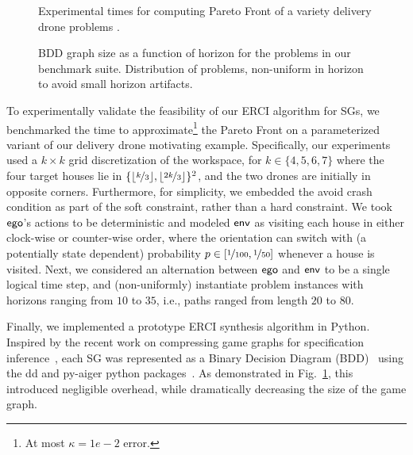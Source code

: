 \begin{figure*}
    \begin{subfigure}{0.5\textwidth}
  \centering
  \scalebox{0.58}{
    
    }
    \caption{
      Experimental times for computing Pareto Front of a variety
      delivery drone problems
      \label{fig:exp_times}.
    }
  \end{subfigure}
  \hfill
    \begin{subfigure}{0.5\textwidth}
    \centering \scalebox{0.53}{
      
    }
    \caption{
      BDD graph size as a function of horizon for the problems in our
      benchmark suite. Distribution of problems, non-uniform in horizon
      to avoid small horizon artifacts\label{fig:bdd_sizes}.
    }
  \end{subfigure}
\end{figure*}

To experimentally validate the feasibility of our ERCI algorithm for
SGs, we benchmarked the time to approximate\footnote{At most $\kappa =
1e-2$ error.} the Pareto Front on a parameterized variant of our
delivery drone motivating example. Specifically, our experiments used
a $k\times k$ grid discretization of the workspace, for $k \in
\{4,5,6,7\}$ where the four target houses lie in
$\{\lfloor\nicefrac{k}{3}\rfloor, \lfloor\nicefrac{2k}{3}\rfloor
\}^2$, and the two drones are initially in opposite
corners. Furthermore, for simplicity, we embedded the avoid crash
condition as part of the soft constraint, rather than a hard
constraint\footnotemark. We took~$\mathsf{ego}$'s actions to be deterministic
and modeled $\mathsf{env}$ as visiting each house in either clock-wise or
counter-wise order, where the orientation can switch with
(a potentially state dependent) probability $p \in [\nicefrac{1}{100},
\nicefrac{1}{50}]$ whenever a house is visited. Next, we considered an
alternation between $\mathsf{ego}$ and $\mathsf{env}$ to be a single logical time
step, and (non-uniformly) instantiate problem instances with horizons
ranging from $10$ to $35$, i.e., paths ranged from length $20$ to
$80$.


Finally, we implemented a prototype ERCI synthesis algorithm in Python.
Inspired by the recent work on compressing game graphs for specification
inference~\cite{DBLP:conf/cav/Vazquez-Chanlatte20}, each SG was represented
as a Binary Decision Diagram (BDD)~\cite{DBLP:journals/csur/Bryant92} using the
dd and py-aiger python packages~\cite{dd, pyAiger}. As demonstrated in Fig.~\ref{fig:exp_times},
this introduced negligible overhead, while dramatically decreasing the size
of the game graph.\footnotemark 


